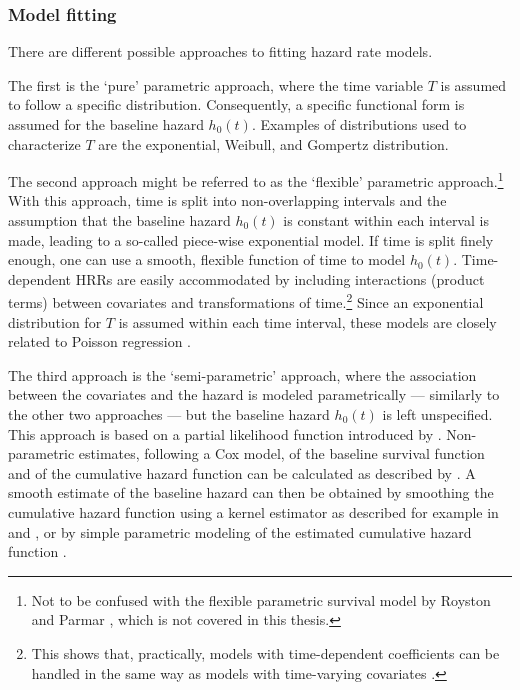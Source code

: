 \subsubsection{Model fitting}
There are different possible approaches to fitting hazard rate models. %

The first is the `pure' parametric approach, where the time variable $T$ is assumed to follow a specific distribution. Consequently, a specific functional form is assumed for the baseline hazard $h_0(t)$. Examples of distributions used to characterize $T$ are the exponential, Weibull, and Gompertz distribution.

The second approach might be referred to as the `flexible' parametric approach.\footnote{Not to be confused with the flexible parametric survival model by Royston and Parmar \citep{royston_flexible_2002, royston_flexible_2011}, which is not covered in this thesis.} With this approach, time is split into non-overlapping intervals and the assumption that the baseline hazard $h_0(t)$ is constant within each interval is made, leading to a so-called piece-wise exponential model. If time is split finely enough, one can use a smooth, flexible function of time to model $h_0(t)$. Time-dependent HRRs are easily accommodated by including interactions (product terms) between covariates and transformations of time.\footnote{This shows that, practically, models with time-dependent coefficients can be handled in the same way as models with time-varying covariates \citep{vanhouwelingen_cox_2013}.} Since an exponential distribution for $T$ is assumed within each time interval, these models are closely related to Poisson regression \citep[section 4.2]{breslow_statistical_1987}.

The third approach is the `semi-parametric' approach, where the association between the covariates and the hazard is modeled parametrically --- similarly to the other two approaches --- but the baseline hazard $h_0(t)$ is left unspecified. This approach is based on a partial likelihood function introduced by \citet{cox_regression_1972}. Non-parametric estimates, following a Cox model, of the baseline survival function and of the cumulative hazard function can be calculated as described by \citet[section~4.3]{kalbfleisch_statistical_2002}. A smooth estimate of the baseline hazard can then be obtained by smoothing the cumulative hazard function using a kernel estimator as described for example in \citet[section~5.3]{breslow_statistical_1987} and \citet[section~8.4]{cleves_introduction_2010}, or by simple parametric modeling of the estimated cumulative hazard function \citep{royston_estimating_2011}. 

